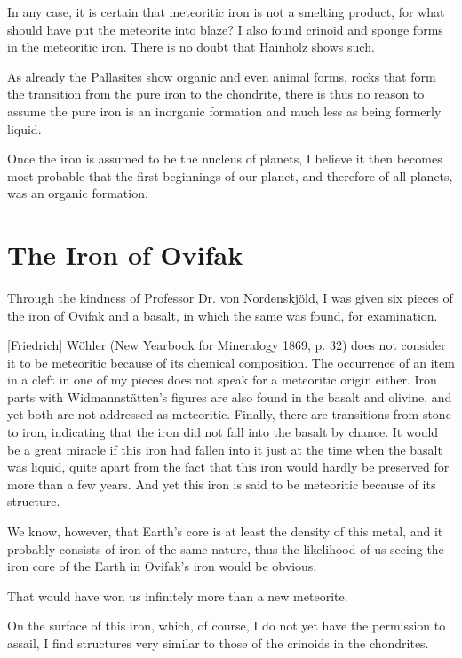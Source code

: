 \documentclass[a4paper, 12pt, oneside]{article}
\begin{document}
In any case, it is certain that meteoritic iron is not a smelting product, for what should have put the meteorite into blaze? I also found crinoid and sponge forms in the meteoritic iron. There is no doubt that Hainholz shows such.

As already the Pallasites show organic and even animal forms, rocks that form the transition from the pure iron to the chondrite, there is thus no reason to assume the pure iron is an inorganic formation and much less as being formerly liquid.

Once the iron is assumed to be the nucleus of planets, I believe it then becomes most probable that the first beginnings of our planet, and therefore of all planets, was an organic formation.
\clearpage
\section{The Iron of Ovifak}
\paragraph{}
Through the kindness of Professor Dr. von Nordenskjöld, I was given six pieces of the iron of Ovifak and a basalt, in which the same was found, for examination.

[Friedrich] Wöhler (New Yearbook for Mineralogy 1869, p. 32) does not consider it to be meteoritic because of its chemical composition. The occurrence of an item in a cleft in one of my pieces does not speak for a meteoritic origin either. Iron parts with Widmannstätten's figures are also found in the basalt and olivine, and yet both are not addressed as meteoritic. Finally, there are transitions from stone to iron, indicating that the iron did not fall into the basalt by chance. It would be a great miracle if this iron had fallen into it just at the time when the basalt was liquid, quite apart from the fact that this iron would hardly be preserved for more than a few years. And yet this iron is said to be meteoritic because of its structure.

We know, however, that Earth's core is at least the density of this metal, and it probably consists of iron of the same nature, thus the likelihood of us seeing the iron core of the Earth in Ovifak's iron would be obvious.

That would have won us infinitely more than a new meteorite.

On the surface of this iron, which, of course, I do not yet have the permission to assail, I find structures very similar to those of the crinoids in the chondrites.
\end{document}
